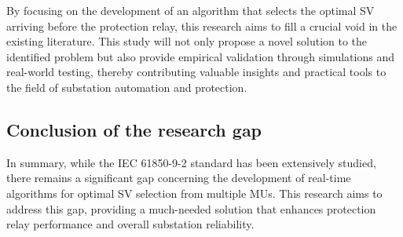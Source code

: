By focusing on the development of an algorithm that selects the optimal SV arriving before the protection relay, this research aims to fill a crucial void in the existing literature. This study will not only propose a novel solution to the identified problem but also provide empirical validation through simulations and real-world testing, thereby contributing valuable insights and practical tools to the field of substation automation and protection.

\subsection{Conclusion of the research gap}

In summary, while the IEC 61850-9-2 standard has been extensively studied, there remains a significant gap concerning the development of real-time algorithms for optimal SV selection from multiple MUs. This research aims to address this gap, providing a much-needed solution that enhances protection relay performance and overall substation reliability.
